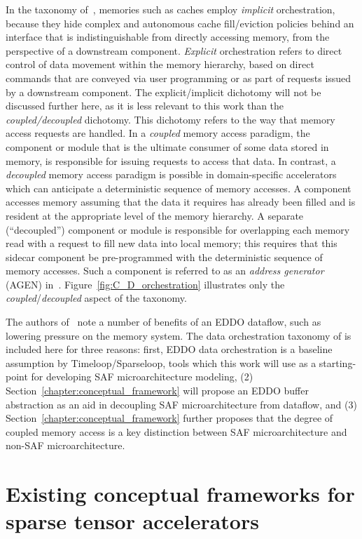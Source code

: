 In the taxonomy of~\cite{buffet}, memories such as caches employ \textit{implicit} orchestration, because they hide complex and autonomous cache fill/eviction policies behind an interface that is indistinguishable from directly accessing memory, from the perspective of a downstream component. \textit{Explicit} orchestration refers to direct control of data movement within the memory hierarchy, based on direct commands that are conveyed via user programming or as part of requests issued by a downstream component. The explicit/implicit dichotomy will not be discussed further here, as it is less relevant to this work than the \textit{coupled/decoupled} dichotomy. This dichotomy refers to the way that memory access requests are handled. In a \textit{coupled} memory access paradigm, the component or module that is the ultimate consumer of some data stored in memory, is responsible for issuing requests to access that data. In contrast, a \textit{decoupled} memory access paradigm is possible in domain-specific accelerators which can anticipate a deterministic sequence of memory accesses. A component accesses memory assuming that the data it requires has already been filled and is resident at the appropriate level of the memory hierarchy. A separate (``decoupled'') component or module is responsible for overlapping each memory read with a request to fill new data into local memory; this requires that this sidecar component be pre-programmed with the deterministic sequence of memory accesses. Such a component is referred to as an \textit{address generator} (AGEN) in~\cite{buffet}. Figure~\ref{fig:C_D_orchestration} illustrates only the \textit{coupled}/\textit{decoupled} aspect of the taxonomy.

The authors of~\cite{buffet} note a number of benefits of an EDDO dataflow, such as lowering pressure on the memory system. The data orchestration taxonomy of \cite{buffet} is included here for three reasons: first, EDDO data orchestration is a baseline assumption by Timeloop\cite{timeloop}/Sparseloop\cite{sparseloop}, tools which this work will use as a starting-point for developing SAF microarchitecture modeling, (2) Section~\ref{chapter:conceptual_framework} will propose an EDDO buffer abstraction as an aid in decoupling SAF microarchitecture from dataflow, and (3) Section~\ref{chapter:conceptual_framework} further proposes that the degree of coupled memory access is a key distinction between SAF microarchitecture and non-SAF microarchitecture.

\section{Existing conceptual frameworks for sparse tensor accelerators}

